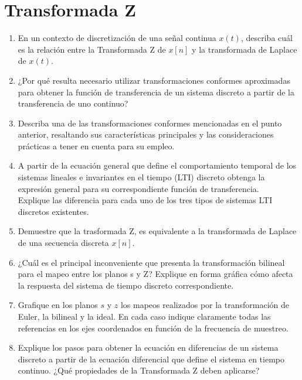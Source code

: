 \documentclass[a4paper,10pt,spanish]{article}
\begin{document}
\section{Transformada Z}

\begin{enumerate}
\item En un contexto de discretización de una señal continua $x(t)$, describa cuál es la relación entre la Transformada Z de $x[n]$ y la transformada de Laplace de $x(t)$.

\item ¿Por qué resulta necesario utilizar transformaciones conformes aproximadas para obtener la función de transferencia de un sistema discreto a partir de la transferencia de uno continuo?

\item Describa una de las transformaciones conformes mencionadas en el punto anterior, resaltando sus características principales y las consideraciones  prácticas a tener en cuenta para su empleo.

\item A partir de la ecuación general que define el comportamiento temporal de los sistemas lineales e invariantes en el tiempo (LTI) discreto obtenga la expresión general para su correspondiente función de transferencia.\\
Explique las diferencia para cada uno de los tres tipos de sistemas LTI discretos existentes.

\item Demuestre que la trasformada Z, es equivalente a la transformada de Laplace de una secuencia discreta $x[n]$.

\item ¿Cuál es el principal inconveniente que presenta la transformación bilineal para el mapeo entre los planos s y Z? Explique en forma gráfica cómo afecta la respuesta del sistema de tiempo discreto correspondiente.

\item Grafique en los planos $s$ y $z$ los mapeos realizados por la transformación de Euler, la bilineal y la ideal. En cada caso indique claramente todas las referencias en los ejes coordenados en función de la frecuencia de muestreo.

\item Explique los pasos para obtener la ecuación en diferencias de un sistema discreto a partir de la ecuación diferencial que define el sistema en tiempo continuo. ¿Qué propiedades de la Transformada Z deben aplicarse?


\end{enumerate}
\end{document}
